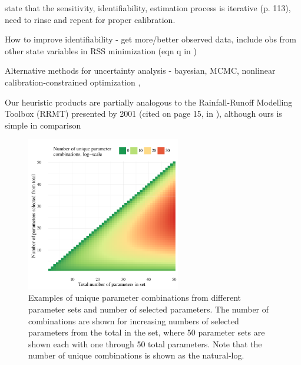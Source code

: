 \documentclass[letterpaper,12pt,oneside]{article}\usepackage[]{graphicx}\usepackage[]{color}
\begin{document}
\cite{Omlin01} state that the sensitivity, identifiability, estimation process is iterative (p. 113), need to rinse and repeat for proper calibration. 

How to improve identifiability - get more/better observed data, include obs from other state variables in RSS minimization (eqn q in \cite{Omlin01})

Alternative methods for uncertainty analysis - bayesian, MCMC, nonlinear calibration-constrained optimization \citep{Gallagher07}, \citep{Arhonditsis08}

Our heuristic products are partially analogous to the Rainfall-Runoff Modelling Toolbox (RRMT) presented by \citep{Wagener01b}2001 (cited on page 15, in \citealt{Wagener01}), although ours is simple in comparison

\clearpage
\begin{singlespace}


\end{singlespace}
\clearpage















\clearpage


\begin{figure}[!ht]

{\centering \includegraphics[width=0.6\textwidth]{figs/combnex-1} 

}

\caption[Examples of unique parameter combinations from different parameter sets and number of selected parameters]{Examples of unique parameter combinations from different parameter sets and number of selected parameters.  The number of combinations are shown for increasing numbers of selected parameters from the total in the set, where 50 parameter sets are shown each with one through 50 total parameters. Note that the number of unique combinations is shown as the natural-log.}\label{fig:combnex}
\end{figure}
\end{document}
